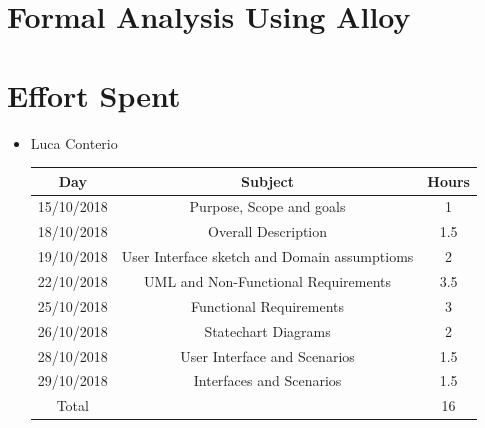 \documentclass[12pt,a4paper]{article}
\begin{document}
	
	\newpage
	\section{Formal Analysis Using Alloy}
	
	\newpage
	
	\section{Effort Spent}
	\begin{itemize}
		\item Luca Conterio
		\begin{center}
			\begin{tabular}{| c | c | c |}
				\hline
				Day & Subject & Hours \\ \hline
				15/10/2018 & Purpose, Scope and goals & 1 \\
				18/10/2018 & Overall Description & 1.5 \\
				19/10/2018  & User Interface sketch and Domain assumptioms & 2 \\
				22/10/2018  & UML and Non-Functional Requirements & 3.5 \\
				25/10/2018 & Functional Requirements & 3 \\
				26/10/2018 & Statechart Diagrams & 2 \\
				28/10/2018 & User Interface and Scenarios & 1.5 \\
				29/10/2018 & Interfaces and Scenarios & 1.5 \\
				\hline
				Total & & 16 \\
				\hline
			\end{tabular}
		\end{center}
		

\end{itemize}
\end{document}

